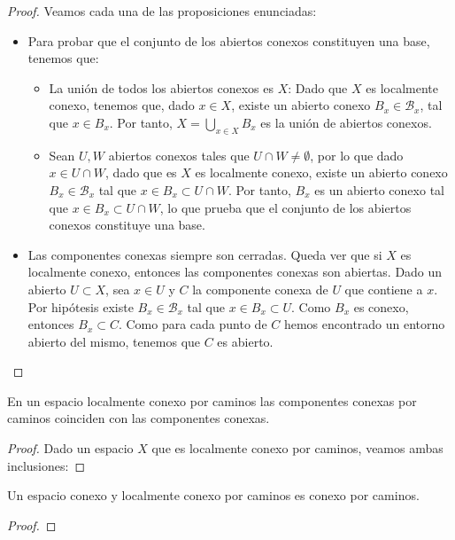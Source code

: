 \begin{proof}
    Veamos cada una de las proposiciones enunciadas: 
    \begin{itemize}
        \item Para probar que el conjunto de los abiertos conexos constituyen una base, tenemos que:
        \begin{itemize}
            \item La unión de todos los abiertos conexos es $X$: Dado que $X$ es localmente conexo, tenemos que, dado $x \in X$, existe un abierto conexo $B_x \in \mathcal{B}_x$, tal que $x \in B_x$. Por tanto, $X = \bigcup_{x \in X} B_x$ es la unión de abiertos conexos.
            \item Sean $U, W$ abiertos conexos tales que $U \cap W \neq \emptyset$, por lo que dado $x \in U \cap W$, dado que es $X$ es localmente conexo, existe un abierto conexo $B_x \in \mathcal{B}_x$ tal que $x \in B_x \subset U \cap W$. Por tanto, $B_x$ es un abierto conexo tal que $x \in B_x \subset U \cap W$, lo que prueba que el conjunto de los abiertos conexos constituye una base.
        \end{itemize}
        \item Las componentes conexas siempre son cerradas. Queda ver que si $X$ es localmente conexo, entonces las componentes conexas son abiertas. Dado un abierto $U \subset X$, sea $x \in U$ y $C$ la componente conexa de $U$ que contiene a $x$. Por hipótesis existe $B_x \in \mathcal{B}_x$ tal que $x \in B_x \subset U$. Como $B_x$ es conexo, entonces $B_x \subset C$. Como para cada punto de $C$ hemos encontrado un entorno abierto del mismo, tenemos que $C$ es abierto. 

    \end{itemize}
\end{proof}
\begin{proposición}
    En un espacio localmente conexo por caminos las componentes conexas por caminos coinciden con las componentes conexas.
\end{proposición}
\begin{proof}
    Dado un espacio $X$ que es localmente conexo por caminos, veamos ambas inclusiones:

\end{proof}
\begin{corolario}
    Un espacio conexo y localmente conexo por caminos es conexo por caminos.
\end{corolario}
\begin{proof}
\end{proof}
